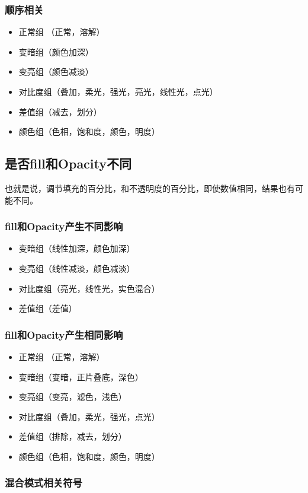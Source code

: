\subsubsection{ 顺序相关}
\begin{itemize}
	\item 正常组 （正常，溶解）
	\item 变暗组（颜色加深）
	\item 变亮组（颜色减淡）
	\item 对比度组（叠加，柔光，强光，亮光，线性光，点光）
	\item 差值组（减去，划分）
	\item 颜色组（色相，饱和度，颜色，明度）
\end{itemize}
\subsection{ 是否fill和Opacity不同}
也就是说，调节填充的百分比，和不透明度的百分比，即使数值相同，结果也有可能不同。
\subsubsection{ fill和Opacity产生不同影响}
\begin{itemize}
	\item 变暗组（线性加深，颜色加深）
	\item 变亮组（线性减淡，颜色减淡）
	\item 对比度组（亮光，线性光，实色混合）
	\item 差值组（差值）
\end{itemize}
\subsubsection{ fill和Opacity产生相同影响}
\begin{itemize}
	\item 正常组 （正常，溶解）
	\item 变暗组（变暗，正片叠底，深色）
	\item 变亮组（变亮，滤色，浅色）
	\item 对比度组（叠加，柔光，强光，点光）
	\item 差值组（排除，减去，划分）
	\item 颜色组（色相，饱和度，颜色，明度）
\end{itemize}
\subsubsection{ 混合模式相关符号}

